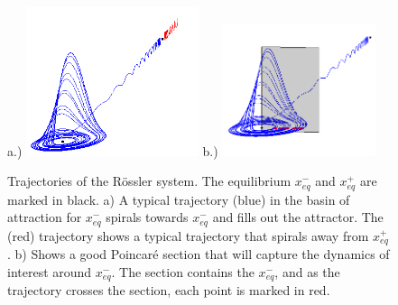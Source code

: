 \documentclass[10pt,letter]{article}
\begin{document}
 \begin{figure}[h]
\centering
a.)  \includegraphics[width=0.45\textwidth]{Figs/Section1/kcRosslerTrajc.png}
b.)
  \includegraphics[width=0.40\textwidth]{Figs/Section1/kcRosslerTrajwithPSc.png}
\caption{Trajectories of the R\"ossler system.  The equilibrium
$x_{eq}^{-}$ and $x_{eq}^{+}$ are marked in black.  a) A typical
trajectory (blue) in the basin of attraction for $x_{eq}^{-}$ spirals
towards $x_{eq}^{-}$ and fills out the attractor.  The (red) trajectory
shows a typical trajectory that spirals away from $x_{eq}^{+}$.  b) Shows
a good Poincar\'e section that will capture the dynamics of interest
around $x_{eq}^{-}$.  The section contains the $x_{eq}^{-}$, and as the
trajectory crosses the section, each point is marked in red.}
 \label{fig:RossTraj}
\end{figure}
\end{document}
